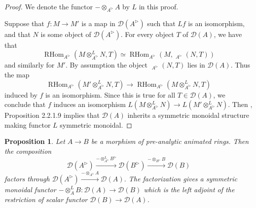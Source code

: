 \documentclass{article}
\theoremstyle{plain}
\newtheorem{prop}[thm]{Proposition}
\theoremstyle{definition}
\theoremstyle{remark}
\DeclareMathOperator{\rhom}{RHom}
\DeclareMathOperator{\rhoms}{\underline{RHom}}
\newcommand{\dten}{\otimes ^{L}}
\newcommand{\huflag}{\triangleright}
\newcommand{\D}{\mathcal{D}}
\begin{document}
\begin{proof}
We denote the functor $ -\otimes _{A ^{\huflag}} A $ by $ L $ in this proof.

Suppose that $ f: M\to M' $ is a map in $ \D (A ^{\huflag}) $
such that $ Lf $ is an isomorphism, and that $ N $ is some object of $ \D (A ^{\huflag}) $.
For every object $ T $ of $ \D (A) $, we have that
\begin{equation*}
\rhom _{A ^{\huflag}}(M \dten _{A ^{\huflag}} N, T) \simeq \rhom _{A ^{\huflag}}(M, \rhoms _{A ^{\huflag}}(N, T))
\end{equation*}
and similarly for $ M' $.
By assumption the object $ \rhoms _{A ^{\huflag}}(N, T) $ lies in $ \D (A) $.
Thus the map
\begin{equation*}
\rhom _{A ^{\huflag}}(M' \dten _{A ^{\huflag}} N, T) \to \rhom _{A ^{\huflag}}(M \dten _{A ^{\huflag}} N, T)
\end{equation*}
induced by $ f $ is an isomorphism.
Since this is true for all $ T\in \D (A) $, we conclude that $ f $ induces an isomorphism
$ L(M\dten _{A ^{\huflag}} N)\to L(M' \dten _{A ^{\huflag}} N) $.
Then \cite{ha}, Proposition 2.2.1.9 implies that $ \D (A) $ inherits a symmetric monoidal structure making functor $ L $ symmetric monoidal.
\end{proof}

\begin{prop}
Let $ A\to B $ be a morphism of pre-analytic animated rings. Then the composition
\begin{equation*}
\D (A ^{\huflag}) \xrightarrow{- \dten _{A ^{\huflag}} B ^{\huflag}} \D (B ^{\huflag}) \xrightarrow{-\otimes _{B ^{\huflag}} B} \D (B)
\end{equation*}
factors through $ \D (A ^{\huflag}) \xrightarrow{-\otimes _{A ^{\huflag}} A}\D (A) $.
The factorization gives a symmetric monoidal functor $ -\dten _{A} B: \D (A)\to \D (B) $
which is the left adjoint of the restriction of scalar functor $ \D (B)\to \D (A) $.
\end{prop}
\end{document}
